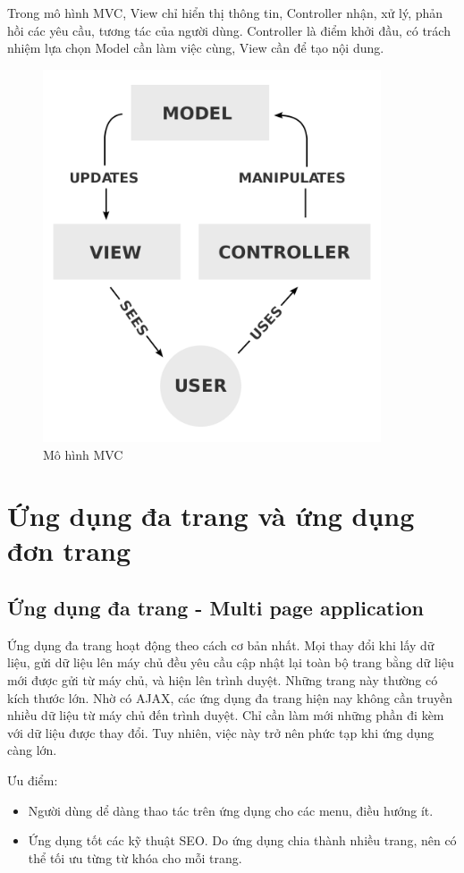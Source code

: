 Trong mô hình MVC, View chỉ hiển thị thông tin, Controller nhận, xử lý, phản hồi các yêu cầu, tương tác của người dùng. Controller là điểm khởi đầu, có trách nhiệm lựa chọn Model cần làm việc cùng, View cần để tạo nội dung.
\begin{figure}[H]
\centering
\includegraphics[width=10cm]{image/MVC.png}
\caption{Mô hình MVC}
\label{fig:mvcmodel}
\end{figure}

\section{Ứng dụng đa trang và ứng dụng đơn trang}
\subsection{Ứng dụng đa trang - Multi page application}
Ứng dụng đa trang hoạt động theo cách cơ bản nhất. Mọi thay đổi khi lấy dữ liệu, gửi dữ liệu lên máy chủ đều yêu cầu cập nhật lại toàn bộ trang bằng dữ liệu mới được gửi từ máy chủ, và hiện lên trình duyệt. Những trang này thường có kích thước lớn. Nhờ có AJAX, các ứng dụng đa trang hiện nay không cần truyền nhiều dữ liệu từ máy chủ đến trình duyệt. Chỉ cần làm mới những phần đi kèm với dữ liệu được thay đổi. Tuy nhiên, việc này trở nên phức tạp khi ứng dụng càng lớn.

Ưu điểm: 
\begin{itemize}
    \item Người dùng dể dàng thao tác trên ứng dụng cho các menu, điều hướng ít.
    \item Ứng dụng tốt các kỹ thuật SEO. Do ứng dụng chia thành nhiều trang, nên có thể tối ưu từng từ khóa cho mỗi trang.
\end{itemize}

